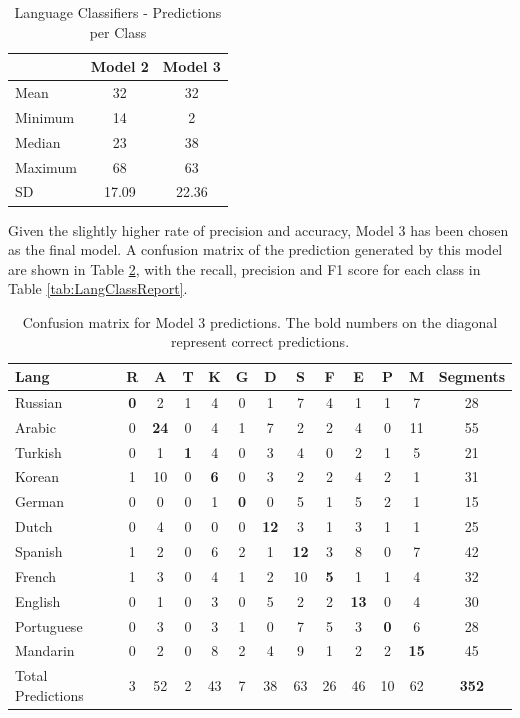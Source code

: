 \begin{table}[h]
\begin{center}
\caption{Language Classifiers - Predictions per Class}
\begin{tabular}{l c  c}
	& Model 2	& Model 3 \\ \hline
Mean	&32		& 32\\
Minimum	&14		& 2\\
Median	&23		& 38 \\
Maximum	&68		& 63	\\
SD		&17.09	&22.36\\ 

\end{tabular}
\label{tab:LangPredict} 
\end{center}
\end{table} 

Given the slightly higher rate of precision and accuracy, Model 3 has been chosen as the final model. A confusion matrix of the prediction generated by this model are shown in Table \ref{tab:LangConfMat}, with the recall, precision and F1 score for each class in Table \ref{tab:LangClassReport}.

\begin{table}
\begin{center}
\caption{Confusion matrix for Model 3 predictions. The bold numbers on the diagonal represent correct predictions.}
\begin{tabular}{l | c c c c c c c c c c c || c}
Lang			&R &A &T &K &G &D &S &F &E &P &M & Segments\\ \hline
Russian		&\textbf{0}  &2  &1  &4  &0  &1  &7  &4  &1  &1  &7 &28\\
Arabic		&0 &\textbf{24}  &0  &4  &1  &7  &2  &2  &4  &0 &11 &55\\
Turkish		&0  &1  &\textbf{1}  &4  &0  &3  &4  &0   &2  &1  &5 &21\\
Korean		&1 &10  &0  &\textbf{6}  &0  &3  &2  &2  &4  &2  &1 &31\\
German		&0  &0  &0  &1  &\textbf{0}  &0  &5  &1  &5  &2  &1 &15\\
Dutch		&0  &4  &0  &0  &0 &\textbf{12} & 3  &1  &3  &1  &1 &25\\
Spanish		&1  &2  &0  &6  &2  &1 &\textbf{12}  &3  &8  &0  &7 &42\\
French		&1  &3  &0  &4  &1  &2 &10 & \textbf{5}  &1  &1  &4 &32\\
English		&0  &1  &0  &3  &0  &5  &2  & 2 &\textbf{13}  &0  &4 &30\\
Portuguese	&0  &3  &0  &3  &1  &0  &7  & 5  & 3  &\textbf{0}  &6 &28\\
Mandarin		&0  &2 & 0  &8  &2  &4  &9  & 1  & 2  &2 &\textbf{15} &45\\ \hline
Total Predictions&3 &52 &2 &43 &7 &38 &63 &26 &46 &10 &62 &\textbf{352}\\

\end{tabular}
\label{tab:LangConfMat}
\end{center}
\end{table}

